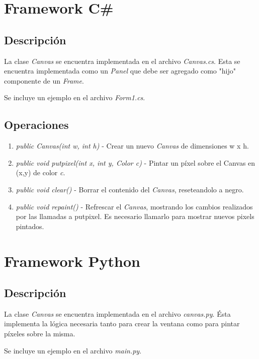 \documentclass[11pt]{amsart}
\begin{document}
\section{Framework C\#}

\subsection{Descripci\'on}
La clase \emph{Canvas} se encuentra implementada en el archivo \emph{Canvas.cs}. Esta se encuentra implementada como un \emph{Panel} que debe ser agregado como "hijo" componente de un \emph{Frame}.

Se incluye un ejemplo en el archivo \emph{Form1.cs}.

\subsection{Operaciones}
\begin{enumerate}
	\item \emph{public Canvas(int w, int h)} - Crear un nuevo \emph{Canvas} de dimensiones w x h.
	\item \emph{public void putpixel(int x, int y, Color c)} - Pintar un p\'ixel sobre el Canvas en (x,y) de color \emph{c}.
	\item \emph{public void clear()} - Borrar el contenido del \emph{Canvas}, reseteandolo a negro.
	\item \emph{public void repaint()} - Refrescar el \emph{Canvas}, mostrando los cambios realizados por las llamadas a putpixel. Es necesario llamarlo para mostrar nuevos pixels pintados.
\end{enumerate}

\section{Framework Python}

\subsection{Descripci\'on}

La clase \emph{Canvas} se encuentra implementada en el archivo \emph{canvas.py}. \'Esta implementa la l\'ogica necesaria tanto para crear la ventana como para pintar p\'ixeles sobre la misma.

Se incluye un ejemplo en el archivo \emph{main.py}.
\end{document}
